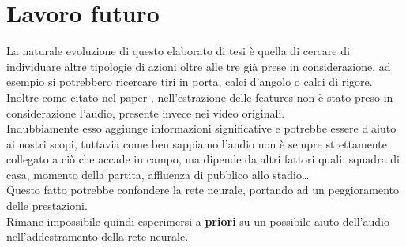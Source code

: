 \section{Lavoro futuro}
La naturale evoluzione di questo elaborato di tesi è quella di cercare di individuare altre tipologie di azioni oltre alle tre già prese in considerazione, ad esempio si potrebbero ricercare tiri in porta, calci d'angolo o calci di rigore.
\\Inoltre come citato nel paper \citep{soccerNet}, nell'estrazione delle features non è stato preso in considerazione l'audio, presente invece nei video originali.
\\Indubbiamente esso aggiunge informazioni significative e potrebbe essere d'aiuto ai nostri scopi, tuttavia come ben sappiamo l'audio non è sempre strettamente collegato a ciò che accade in campo, ma dipende da altri fattori quali: squadra di casa, momento della partita, affluenza di pubblico allo stadio\ldots
\\Questo fatto potrebbe confondere la rete neurale, portando ad un peggioramento delle prestazioni.
\\Rimane impossibile quindi esperimersi a \textbf{priori} su un possibile aiuto dell'audio nell'addestramento della rete neurale.
